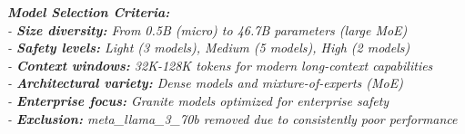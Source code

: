 \begin{table}[htbp]
\begin{minipage}{\textwidth}
\vspace{0.5em}
\small
\textit{
\textbf{Model Selection Criteria:} \\
- \textbf{Size diversity:} From 0.5B (micro) to 46.7B parameters (large MoE) \\
- \textbf{Safety levels:} Light (3 models), Medium (5 models), High (2 models) \\
- \textbf{Context windows:} 32K-128K tokens for modern long-context capabilities \\
- \textbf{Architectural variety:} Dense models and mixture-of-experts (MoE) \\
- \textbf{Enterprise focus:} Granite models optimized for enterprise safety \\
- \textbf{Exclusion:} meta\_llama\_3\_70b removed due to consistently poor performance
}
\end{minipage}
\end{table}